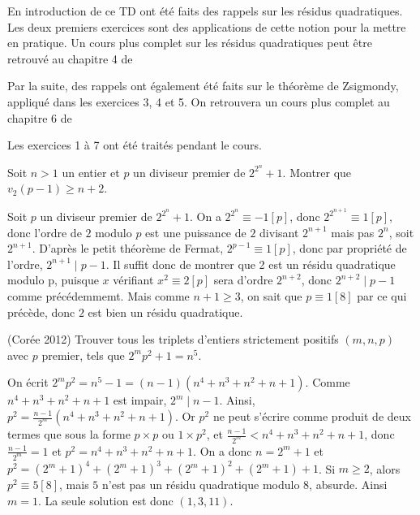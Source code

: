 En introduction de ce TD ont été faits des rappels sur les résidus quadratiques. Les deux premiers exercices sont des applications de cette notion pour la mettre en pratique. Un cours plus complet sur les résidus quadratiques peut être retrouvé au chapitre 4 de

Par la suite, des rappels ont également été faits sur le théorème de Zsigmondy, appliqué dans les exercices 3, 4 et 5. On retrouvera un cours plus complet au chapitre 6 de %

Les exercices 1 à 7 ont été traités pendant le cours.

\begin{exo}
Soit $n>1$ un entier et $p$ un diviseur premier de $2^{2^n}+1$. Montrer que $v_2(p-1)\ge n+2$.
\end{exo}


\begin{sol}
Soit $p$ un diviseur premier de $2^{2^n}+1$. On a $2^{2^n}\equiv -1[p]$, donc $2^{2^{n+1}}\equiv 1[p]$, donc l'ordre de $2$ modulo $p$ est une puissance de $2$ divisant $2^{n+1}$ mais pas $2^n$, soit $2^{n+1}$. D'après le petit théorème de Fermat, $2^{p-1}\equiv 1[p]$, donc par propriété de l'ordre, $2^{n+1}\mid p-1$. Il suffit donc de montrer que 2 est un résidu quadratique modulo p, puisque $x$ vérifiant $x^2\equiv 2[p]$ sera d'ordre $2^{n+2}$, donc $2^{n+2}\mid p-1$ comme précédemmemt. Mais comme $n+1\ge 3$, on sait que $p\equiv1[8]$ par ce qui précède, donc $2$ est bien un résidu quadratique.
\end{sol}


\begin{exo}
(Corée 2012) Trouver tous les triplets d'entiers strictement positifs $(m,n,p)$ avec $p$ premier, tels que $2^mp^2+1=n^5$.
\end{exo}


\begin{sol}
On écrit $2^m p^2 = n^5-1 = (n-1)(n^4+n^3+n^2+n+1)$. Comme $n^4+n^3+n^2+n+1$ est impair, $2^m\mid n-1$.
\newline Ainsi, $p^2 = \frac{n-1}{2^m} (n^4+n^3+n^2+n+1)$. Or $p^2$ ne peut s'écrire comme produit de deux termes que sous la forme $p\times p$ ou $1\times p^2$, et $\frac{n-1}{2^m} < n^4+n^3+n^2+n+1$, donc $\frac{n-1}{2^m} = 1$ et $p^2 = n^4+n^3+n^2+n+1$.
\newline On a donc $n = 2^m +1$ et $p^2 = (2^m +1)^4+(2^m +1)^3+(2^m +1)^2+(2^m +1)+1$. Si $m\ge 2$, alors $p^2\equiv 5[8]$, mais $5$ n'est pas un résidu quadratique modulo $8$, absurde. Ainsi $m=1$. La seule solution est donc $(1,3,11)$.
\end{sol}


